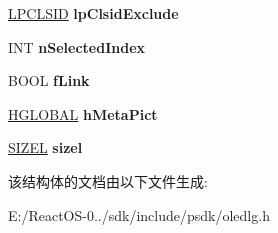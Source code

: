 \begin{DoxyCompactItemize}
\hyperlink{interface_g_u_i_d}{L\+P\+C\+L\+S\+ID} {\bfseries lp\+Clsid\+Exclude}
\item 
\mbox{\label{structtag_o_l_e_u_i_p_a_s_t_e_s_p_e_c_i_a_l_a_a29a151c526cb26584400183ee23c92c1}} 
I\+NT {\bfseries n\+Selected\+Index}
\item 
\mbox{\label{structtag_o_l_e_u_i_p_a_s_t_e_s_p_e_c_i_a_l_a_a438ce3afea9ed5507c630650833d0600}} 
B\+O\+OL {\bfseries f\+Link}
\item 
\mbox{\label{structtag_o_l_e_u_i_p_a_s_t_e_s_p_e_c_i_a_l_a_a73dbb52a140b56dafa6540d1b992798f}} 
\hyperlink{interfacevoid}{H\+G\+L\+O\+B\+AL} {\bfseries h\+Meta\+Pict}
\item 
\mbox{\label{structtag_o_l_e_u_i_p_a_s_t_e_s_p_e_c_i_a_l_a_ab052c13b91bcb312bf78a23067e00405}} 
\hyperlink{structtag_s_i_z_e}{S\+I\+Z\+EL} {\bfseries sizel}
\end{DoxyCompactItemize}


该结构体的文档由以下文件生成\+:\begin{DoxyCompactItemize}
\item 
E\+:/\+React\+O\+S-\/0../sdk/include/psdk/oledlg.\+h\end{DoxyCompactItemize}
